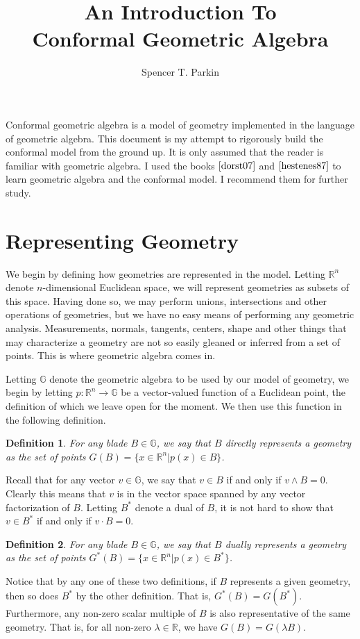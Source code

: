 \documentclass[12pt]{article}
\title{An Introduction To\\Conformal Geometric Algebra}
\author{Spencer T. Parkin}
\newcommand{\G}{\mathbb{G}}
\newcommand{\R}{\mathbb{R}}
\newtheorem{definition}{Definition}[section]
\begin{document}
\maketitle

Conformal geometric algebra is a model of
geometry implemented in the language of geometric algebra.
This document is my attempt to rigorously build the
conformal model from the ground up.
It is only assumed that the reader is familiar with geometric algebra.
I used the books $\cite{dorst07}$ and $\cite{hestenes87}$
to learn geometric algebra and the conformal model.
I recommend them for further study.

\section{Representing Geometry}

We begin by defining how geometries are represented in the model.
Letting $\R^n$ denote $n$-dimensional Euclidean space, we will
represent geometries as subsets of this space.  Having done so,
we may perform unions, intersections and other operations of geometries, but we
have no easy means of performing any geometric analysis.  Measurements, normals,
tangents, centers, shape and other things that may characterize a geometry are not
so easily gleaned or inferred from a set of points.  This is where
geometric algebra comes in.

Letting $\G$ denote the geometric algebra to be used by our model
of geometry, we begin by letting $p:\R^n\to\G$ be a vector-valued
function of a Euclidean point, the definition of which we leave
open for the moment.  We then use this function in the following definition.
\begin{definition}\label{def_direct_rep}
For any blade $B\in\G$, we say that $B$ directly
represents a geometry as the set of points
$G(B)=\{x\in\R^n|p(x)\in B\}$.
\end{definition}
Recall that for any vector $v\in\G$, we say that $v\in B$ if and only if $v\wedge B=0$.
Clearly this means that $v$ is in the vector space spanned by any vector factorization
of $B$.  Letting $B^*$ denote a dual of $B$, it is not hard to show that
$v\in B^*$ if and only if $v\cdot B=0$.
\begin{definition}\label{def_dual_rep}
For any blade $B\in\G$, we say that $B$ dually
represents a geometry as the set of points
$G^*(B)=\{x\in\R^n|p(x)\in B^*\}$.
\end{definition}
Notice that by any one of these two definitions, if $B$ represents
a given geometry, then so does $B^*$ by the other definition.
That is, $G^*(B)=G(B^*)$.
Furthermore, any non-zero scalar multiple of $B$ is also representative
of the same geometry.  That is, for all non-zero $\lambda\in\R$,
we have $G(B)=G(\lambda B)$.
\end{document}
